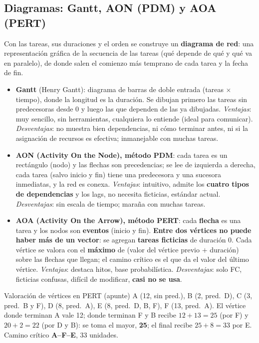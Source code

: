 \documentclass[11pt,a4paper]{article}
\begin{document}
\subsection{Diagramas: Gantt, AON (PDM) y AOA (PERT)}
Con las tareas, sus duraciones y el orden se construye un \textbf{diagrama de red}: una representación gráfica
de la secuencia de las tareas (qué depende de qué y qué va en paralelo), de donde salen el comienzo más temprano
de cada tarea y la fecha de fin.
\begin{itemize}
  \item \textbf{Gantt} (Henry Gantt): diagrama de barras de doble entrada (tareas $\times$ tiempo), donde la
  longitud es la duración. Se dibujan primero las tareas sin predecesoras desde 0 y luego las que dependen de
  las ya dibujadas. \emph{Ventajas}: muy sencillo, sin herramientas, cualquiera lo entiende (ideal para comunicar).
  \emph{Desventajas}: no muestra bien dependencias, ni cómo terminar antes, ni si la asignación de recursos es
  efectiva; inmanejable con muchas tareas.
  \item \textbf{AON (Activity On the Node), método PDM}: cada tarea es un rectángulo (nodo) y las flechas son
  precedencias; se lee de izquierda a derecha, cada tarea (salvo inicio y fin) tiene una predecesora y una
  sucesora inmediatas, y la red es conexa. \emph{Ventajas}: intuitivo, admite los \textbf{cuatro tipos de
  dependencias} y los lags, no necesita ficticias, estándar actual. \emph{Desventajas}: sin escala de tiempo;
  maraña con muchas tareas.
  \item \textbf{AOA (Activity On the Arrow), método PERT}: cada \textbf{flecha} es una tarea y los nodos son
  \textbf{eventos} (inicio y fin). \textbf{Entre dos vértices no puede haber más de un vector}: se agregan
  \textbf{tareas ficticias} de duración 0. Cada vértice se valora con el \textbf{máximo} de (valor del vértice
  previo $+$ duración) sobre las flechas que llegan; el camino crítico es el que da el valor del último vértice.
  \emph{Ventajas}: destaca hitos, base probabilística. \emph{Desventajas}: solo FC, ficticias confusas, difícil
  de modificar, \textbf{casi no se usa}.
\end{itemize}
\begin{ejemplo}{Valoración de vértices en PERT (apunte)}
A (12, sin pred.), B (2, pred.\ D), C (3, pred.\ B y F), D (8, pred.\ A), E (8, pred.\ D, B, F), F (13, pred.\
A). El vértice donde terminan A vale 12; donde terminan F y B recibe $12 + 13 = 25$ (por F) y $20 + 2 = 22$
(por D y B): se toma el mayor, \textbf{25}; el final recibe $25 + 8 = 33$ por E. Camino crítico \textbf{A--F--E},
33 unidades.
\end{ejemplo}
\end{document}
